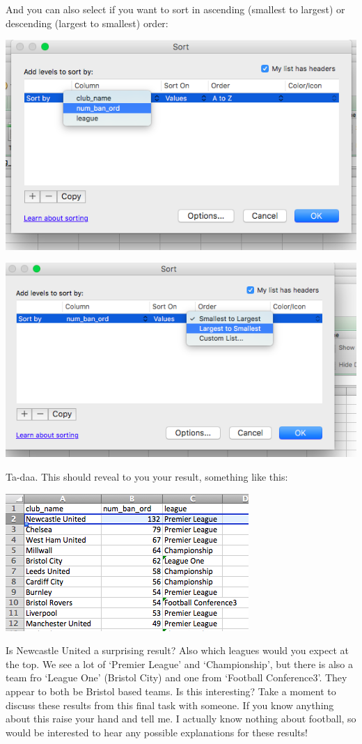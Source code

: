 \documentclass[]{book}
\theoremstyle{definition}
\theoremstyle{definition}
\theoremstyle{definition}
\theoremstyle{remark}
\begin{document}
And you can also select if you want to sort in ascending (smallest to
largest) or descending (largest to smallest) order:

\includegraphics{imgs/sort_by_col.png}

\includegraphics{imgs/large_to_small.png}

Ta-daa. This should reveal to you your result, something like this:

\includegraphics{imgs/top_fbo.png}

Is Newcastle United a surprising result? Also which leagues would you
expect at the top. We see a lot of `Premier League' and `Championship',
but there is also a team fro `League One' (Bristol City) and one from
`Football Conference3'. They appear to both be Bristol based teams. Is
this interesting? Take a moment to discuss these results from this final
task with someone. If you know anything about this raise your hand and
tell me. I actually know nothing about football, so would be interested
to hear any possible explanations for these results!
\end{document}
